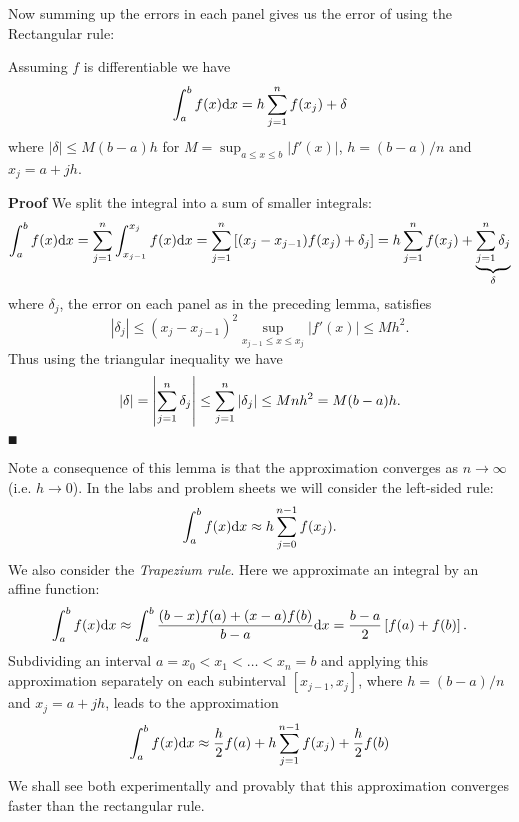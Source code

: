 Now summing up the errors in each panel gives us the error of using the Rectangular rule:

\begin{theorem} Assuming $f$ is differentiable we have
\[
\ensuremath{\int}_a^b f(x) {\rm d}x =  h \ensuremath{\sum}_{j=1}^n f(x_j) +  \ensuremath{\delta}
\]
where $|\ensuremath{\delta}| \ensuremath{\leq} M (b-a) h$ for $M = \sup_{a \ensuremath{\leq} x \ensuremath{\leq} b}|f'(x)|$, $h = (b-a)/n$ and $x_j = a + jh$.

\end{theorem}
\textbf{Proof} We split the integral into a sum of smaller integrals:
\[
\ensuremath{\int}_a^b f(x) {\rm d}x = \ensuremath{\sum}_{j=1}^n  \ensuremath{\int}_{x_{j-1}}^{x_j} f(x) {\rm d}x =
\ensuremath{\sum}_{j=1}^n  \br[(x_j - x_{j-1}) f(x_j) + \ensuremath{\delta}_j] =  h \ensuremath{\sum}_{j=1}^n f(x_j) +  \underbrace{\ensuremath{\sum}_{j=1}^n \ensuremath{\delta}_j}_\ensuremath{\delta}
\]
where $\ensuremath{\delta}_j$, the error on each panel as in the preceding lemma, satisfies
\[
|\ensuremath{\delta}_j| \ensuremath{\leq} (x_j-x_{j-1})^2 \sup_{x_{j-1} \ensuremath{\leq} x \ensuremath{\leq} x_j}|f'(x)| \ensuremath{\leq} M h^2.
\]
Thus using the triangular inequality we have
\[
|\delta| = \left|{ \sum_{j=1}^n \delta_j}\right| \leq \sum_{j=1}^n |\delta_j| \leq M n h^2 = M(b-a)h.
\]
\ensuremath{\QED}

Note a consequence of this lemma is that the approximation converges as $n \ensuremath{\rightarrow} \ensuremath{\infty}$ (i.e. $h \ensuremath{\rightarrow} 0$). In the labs and problem sheets we will consider the left-sided rule:
\[
\ensuremath{\int}_a^b f(x) {\rm d}x \ensuremath{\approx}  h \ensuremath{\sum}_{j=0}^{n-1} f(x_j).
\]
We also consider the \emph{Trapezium rule}. Here we approximate an integral  by an affine function:
\[
\ensuremath{\int}_a^b f(x) {\rm d} x \ensuremath{\approx} \ensuremath{\int}_a^b {(b-x)f(a) + (x-a)f(b) \over b-a} \dx
= {b-a \over 2} \br[f(a) + f(b)].
\]
Subdividing an interval $a = x_0 < x_1 < \ensuremath{\ldots} < x_n = b$ and applying this approximation separately on each subinterval $[x_{j-1},x_j]$, where $h = (b-a)/n$ and $x_j = a + jh$, leads to the approximation
\[
\ensuremath{\int}_a^b f(x) {\rm d}x \ensuremath{\approx}  {h \over 2} f(a) + h \ensuremath{\sum}_{j=1}^{n-1} f(x_j) + {h \over 2} f(b)
\]
We shall see both experimentally and provably that this approximation converges faster than the rectangular rule.



